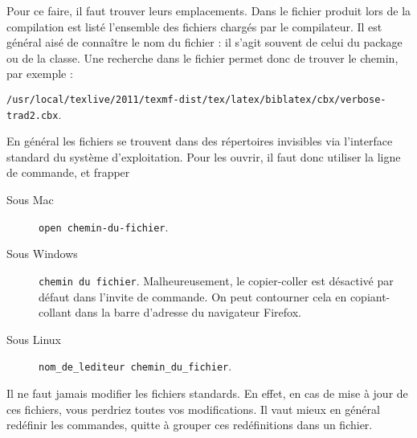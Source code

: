 Pour ce faire, il faut trouver leurs emplacements. Dans le fichier  produit lors de la compilation est listé l'ensemble des fichiers chargés par le compilateur. Il est général aisé de connaître le nom du fichier : il s'agit souvent de celui du package ou de la classe. Une recherche dans le fichier permet donc de trouver le chemin, par exemple : 

\verb|/usr/local/texlive/2011/texmf-dist/tex/latex/biblatex/cbx/verbose-trad2.cbx|.

En général les fichiers se trouvent dans des répertoires invisibles via l'interface standard du système d'exploitation. Pour les ouvrir, il faut donc utiliser la ligne de commande, et frapper 
\begin{description}
\item[Sous Mac]\verb|open chemin-du-fichier|.
\item[Sous Windows] \verb|chemin du fichier|.  Malheureusement, le copier-coller est désactivé par défaut dans l'invite de commande. On peut contourner cela en copiant-collant dans la barre d'adresse du navigateur Firefox.
\item[Sous Linux] \verb|nom_de_lediteur chemin_du_fichier|.
\end{description}
\begin{attention}
Il ne faut jamais modifier les fichiers standards. En effet, en cas de mise à jour de ces fichiers, vous perdriez toutes vos modifications. Il vaut mieux en général redéfinir les commandes, quitte à grouper ces redéfinitions dans un fichier.
\end{attention}

